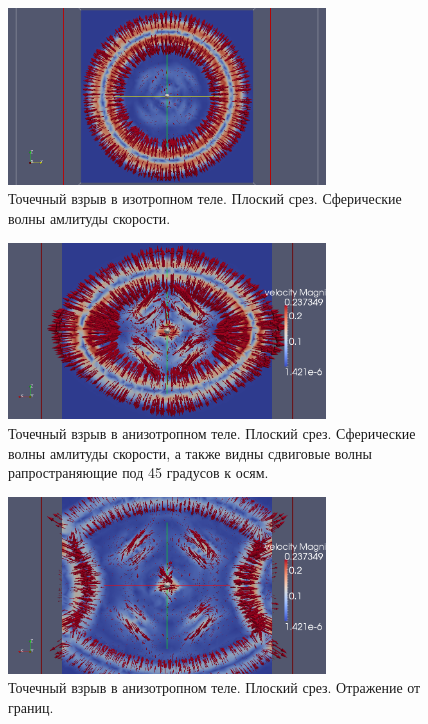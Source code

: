 \begin{figure}[H]
\centerline{\includegraphics[width=0.75\textwidth]{png/dotted_explosion/exp_i_00.png}}
\caption{Точечный взрыв в изотропном теле. Плоский срез. Сферические волны амлитуды скорости.}
\label{pic:isotropic-explosion}
\end{figure}

\begin{figure}[H]
\centerline{\includegraphics[width=0.75\textwidth]{png/dotted_explosion/exp_ai_00.png}}
\caption{Точечный взрыв в анизотропном теле. Плоский срез. Сферические волны амлитуды скорости, а также видны сдвиговые волны рапространяющие под 45 градусов к осям.}
\label{pic:anisotropic-explosion1}
\end{figure}

\begin{figure}[H]
\centerline{\includegraphics[width=0.75\textwidth]{png/dotted_explosion/exp_ai_01.png}}
\caption{Точечный взрыв в анизотропном теле. Плоский срез. Отражение от границ.}
\label{pic:anisotropic-explosion2}
\end{figure}

